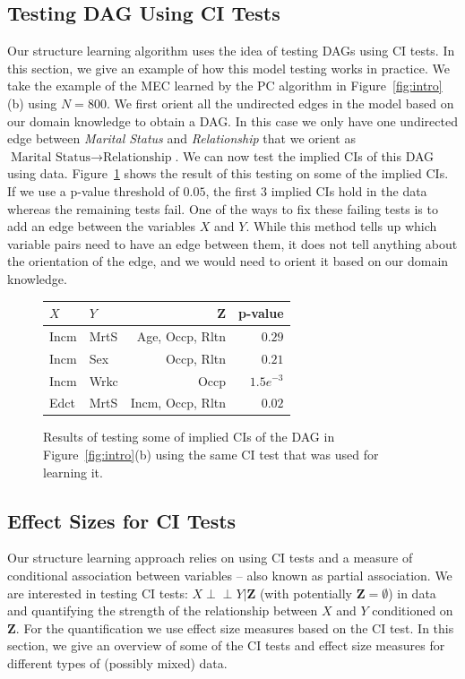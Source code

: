 \documentclass{uai2025} %
\def\ci{\perp\!\!\!\!\!\perp}
\begin{document}
\subsection{Testing DAG Using CI Tests}
Our structure learning algorithm uses the idea of testing DAGs using CI tests.
In this section, we give an example of how this model testing works in
practice. We take the example of the MEC learned by the PC algorithm in
Figure~\ref{fig:intro}(b) using $ N=800 $. We first orient all the undirected
edges in the model based on our domain knowledge to obtain a DAG. In this case
we only have one undirected edge between \emph{Marital Status} and
\emph{Relationship} that we orient as $ \textrm{Marital Status} \rightarrow
\textrm{Relationship} $. We can now test the implied CIs of this DAG using
data. Figure~\ref{fig:ci_table} shows the result of this testing on some of the
implied CIs. If we use a p-value threshold of $ 0.05 $, the first $ 3 $ implied
CIs hold in the data whereas the remaining tests fail. One of the ways to fix
these failing tests is to add an edge between the variables $ X $ and $ Y $.
While this method tells up which variable pairs need to have an edge between
them, it does not tell anything about the orientation of the edge, and we would
need to orient it based on our domain knowledge.

\begin{figure}
	\centering
	\begin{tabular}{llrr}
		$X$ & $Y$ & $ \bm{Z} $ & p-value \\
		\hline
		Incm & MrtS &  Age, Occp, Rltn & $ 0.29 $     \\
		Incm & Sex  &  Occp, Rltn      & $ 0.21 $     \\
		Incm & Wrkc &  Occp 	       & $ 1.5e^{-3} $ \\
		Edct & MrtS & Incm, Occp, Rltn & $ 0.02 $       \\
		\hline
	\end{tabular}
	\caption{Results of testing some of implied CIs of the DAG in
		 Figure~\ref{fig:intro}(b) using the same CI test that was used for
		 learning it.}
	\label{fig:ci_table}
\end{figure}

\subsection{Effect Sizes for CI Tests}
\label{sec:ci_tests}

Our structure learning approach relies on using CI tests and a measure of
conditional association between variables -- also known as partial association.
We are interested in testing CI tests: $ X \ci Y \rvert \bm{Z} $ (with
potentially $ \bm{Z} = \emptyset $) in data and quantifying the strength of the
relationship between $ X $ and $ Y $ conditioned on $ \bm{Z} $. For the
quantification we use effect size measures based on the CI test. In this
section, we give an overview of some of the CI tests and effect size measures
for different types of (possibly mixed) data.
\end{document}
